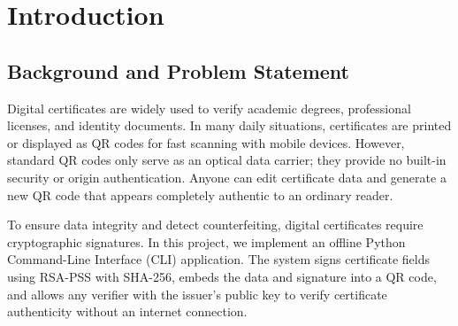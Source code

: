 \documentclass[10pt,a4paper]{article}
\begin{document}
\begin{abstract}
\noindent Standard QR codes store data in plain text without cryptographic protection, making them easy to tamper with or counterfeit. In this project, we design and implement an offline digital certificate verification prototype in Python using RSA-PSS digital signatures and SHA-256. We first demonstrate the mathematical weakness of Textbook RSA, showing how an attacker can forge valid signatures through modular multiplication without knowing the private key. We then explain how RSA-PSS with randomized salt prevents the direct multiplicative forgery demonstrated in textbook RSA. To improve scanning reliability, we build a multi-stage OpenCV decoding pipeline combining \texttt{QRCodeDetectorAruco} with image preprocessing techniques. In tests with 100 generated RSA-2048 QR codes, our pipeline achieved a 100\% decode rate compared to 80\% for the standard OpenCV detector. Finally, we test five security scenarios and benchmark performance across 1024, 2048, and 3072-bit RSA keys, selecting RSA-2048 as the recommended default.
\end{abstract}

\vspace{-0.15cm}
\section{Introduction}

\subsection{Background and Problem Statement}
Digital certificates are widely used to verify academic degrees, professional licenses, and identity documents. In many daily situations, certificates are printed or displayed as QR codes for fast scanning with mobile devices. However, standard QR codes only serve as an optical data carrier; they provide no built-in security or origin authentication. Anyone can edit certificate data and generate a new QR code that appears completely authentic to an ordinary reader.

To ensure data integrity and detect counterfeiting, digital certificates require cryptographic signatures. In this project, we implement an offline Python Command-Line Interface (CLI) application. The system signs certificate fields using RSA-PSS with SHA-256, embeds the data and signature into a QR code, and allows any verifier with the issuer's public key to verify certificate authenticity without an internet connection.
\end{document}
